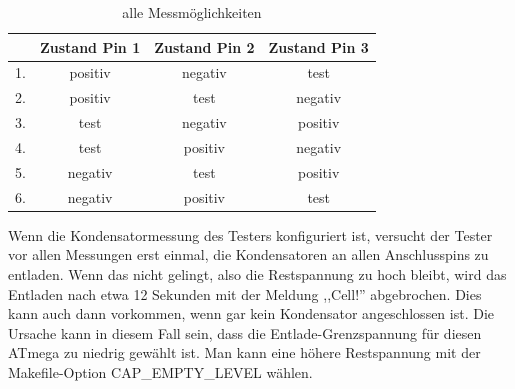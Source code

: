 \begin{table}[H]
  \begin{center}
    \begin{tabular}{| l | c | c | c |}
    \hline
      & Zustand Pin 1 & Zustand Pin 2 & Zustand Pin 3 \\
    \hline
   1. & positiv    &  negativ   &  test \\
   2. & positiv    &  test      & negativ \\
   3. & test       &  negativ   & positiv \\
   4. & test       &  positiv   & negativ \\
   5. & negativ    &  test      & positiv \\
   6. & negativ    &  positiv   &  test  \\
    \hline
    \end{tabular}
  \end{center}
  \caption{alle Messmöglichkeiten}
  \label{tab:case} 
\end{table}

Wenn die Kondensatormessung des Testers konfiguriert ist, versucht der Tester vor allen Messungen erst einmal,
die Kondensatoren an allen Anschlusspins zu entladen. Wenn das nicht gelingt, also die Restspannung zu hoch bleibt,
wird das Entladen nach etwa 12 Sekunden mit der Meldung ,,Cell!'' abgebrochen. Dies kann auch dann vorkommen, wenn
gar kein Kondensator angeschlossen ist. Die Ursache kann in diesem Fall sein, dass die Entlade-Grenzspannung für diesen
ATmega zu niedrig gewählt ist. Man kann eine höhere Restspannung mit der Makefile-Option CAP\_EMPTY\_LEVEL wählen.
